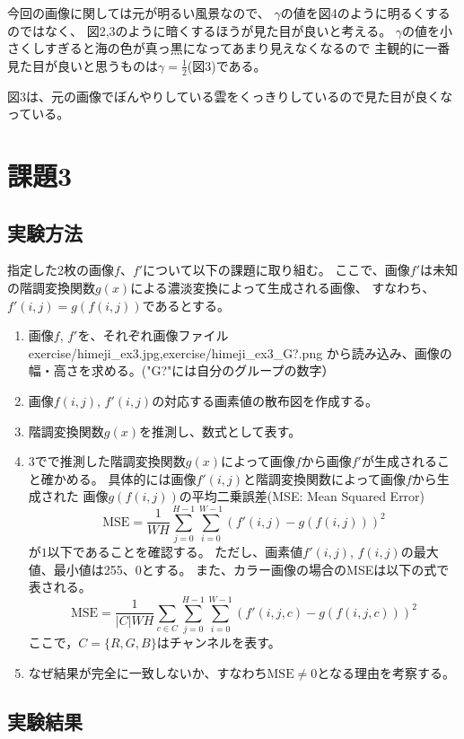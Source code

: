 \documentclass[12pt]{jarticle}
\begin{document}
今回の画像に関しては元が明るい風景なので、
$\gamma$の値を図4のように明るくするのではなく、
図2,3のように暗くするほうが見た目が良いと考える。
$\gamma$の値を小さくしすぎると海の色が真っ黒になってあまり見えなくなるので
主観的に一番見た目が良いと思うものは$\gamma=\frac{1}{2}$(図3)である。

図3は、元の画像でぼんやりしている雲をくっきりしているので見た目が良くなっている。

\section{課題3}
\subsection{実験方法}
指定した2枚の画像$f$、$f'$について以下の課題に取り組む。
ここで、画像$f'$は未知の階調変換関数$g(x)$による濃淡変換によって生成される画像、
すなわち、$f'(i, j)=g(f(i, j))$であるとする。

\begin{enumerate}
    \item 画像$f$, $f'$を、それぞれ画像ファイル exercise/himeji\_ex3.jpg,exercise/himeji\_ex3\_G?.png から読み込み、画像の幅・高さを求める。("G?"には自分のグループの数字）
    \item 画像$f(i, j)$, $f'(i, j)$の対応する画素値の散布図を作成する。
    \item 階調変換関数$g(x)$を推測し、数式として表す。
    \item 3でで推測した階調変換関数$g(x)$によって画像$f$から画像$f'$が生成されること確かめる。
          具体的には画像$f'(i, j)$と階調変換関数によって画像$f$から生成された
          画像$g(f(i, j))$の平均二乗誤差(MSE: Mean Squared Error)
          $$\mbox{MSE}=\frac{1}{WH}\sum_{j=0}^{H-1} \sum_{i=0}^{W-1} \left(f'(i, j) - g(f(i, j))\right)^2$$
          が$1$以下であることを確認する。
          ただし、画素値$f'(i, j)$, $f(i, j)$の最大値、最小値は255、0とする。
          また、カラー画像の場合のMSEは以下の式で表される。
          $$\mbox{MSE}=\frac{1}{|C|WH}\sum_{c\in C}\sum_{j=0}^{H-1} \sum_{i=0}^{W-1} \left(f'(i, j, c) - g(f(i, j, c))\right)^2$$
          ここで，$C=\{R,G,B\}$はチャンネルを表す。
    \item なぜ結果が完全に一致しないか、すなわち$\mbox{MSE}\neq0$となる理由を考察する。
\end{enumerate}

\subsection{実験結果}
\end{document}
